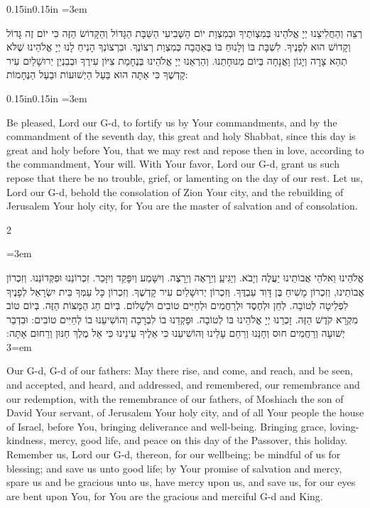 \documentclass[11pt, openany]{book}
\newenvironment{hebrewblock}{%
  \par\vspace{4pt}
  \begin{adjustwidth}{0.15in}{0.15in}
  \begingroup
  \RTL
  \hebrewfont\large
  \setstretch{1.4}
  \emergencystretch=3em
  \tolerance=9999
  \parindent=0pt\relax
}{%
  \endRTL
  \endgroup
  \end{adjustwidth}
  \par\vspace{2pt}
}
\newenvironment{englishblock}{%
  \par\vspace{2pt}
  \begin{adjustwidth}{0.15in}{0.15in}
  \setstretch{1.4}
  \emergencystretch=3em
  \tolerance=9999
  \normalsize
}{%
  \end{adjustwidth}
  \par\vspace{3pt}
}
\newenvironment{bilingual}{%
  \par\vspace{4pt}%
  \begin{paracol}{2}%
}{%
  \end{paracol}%
  \par\vspace{2pt}%
}
\newenvironment{hebrewcol}{%
  \switchcolumn[1]%
  \begingroup
  \RTL
  \hebrewfont\large
  \setstretch{1.4}%
  \emergencystretch=3em
  \tolerance=9999
  \parindent=0pt\relax
}{%
  \endRTL
  \endgroup
}
\newenvironment{englishcol}{%
  \switchcolumn[0]%
  \begingroup
  \setstretch{1.4}%
  \emergencystretch=3em
  \tolerance=9999
  \normalsize
  \rightskip=0.12in\relax
}{%
  \endgroup
}
\newenvironment{shabbatadd}{%
  \par\vspace{3pt}
  \begin{tcolorbox}[
    enhanced,
    breakable,
    colback=sederblue!6,
    colframe=sederblue!6,
    boxrule=0pt,
    left=18pt,
    right=18pt,
    top=6pt,
    bottom=6pt,
    borderline north={0.5pt}{0pt}{sederblue!25},
    borderline south={0.5pt}{0pt}{sederblue!25},
    arc=0pt,
    outer arc=0pt,
    before upper={\small\textcolor{sederblue}{\textit{On Shabbat add:}}\par\vspace{2pt}},
  ]
}{%
  \end{tcolorbox}
  \par\vspace{3pt}
}
\begin{document}
\begin{shabbatadd}

\begin{hebrewblock}
רְצֵה וְהַחֲלִיצֵנוּ יְיָ אֱלֹהֵינוּ בְּמִצְוֹתֶיךָ וּבְמִצְוַת יוֹם הַשְּׁבִיעִי הַשַּׁבָּת הַגָּדוֹל וְהַקָּדוֹשׂ הַזֶּה כִּי יוֹם זֶה גָּדוֹל וְקָדוֹשׁ הוּא לְפָנֶיךָ. לִשְׁבָּת בּוֹ וְלָנוּחַ בּוֹ בְּאַהֲבָה כְּמִצְוַת רְצוֹנֶךָ. וּבִרְצוֹנְךָ הָנִיחַ לָנוּ יְיָ אֱלֹהֵינוּ שֶׁלֹּא תְהֵא צָרָה וְיָגוֹן וַאֲנָחָה בְּיוֹם מְנוּחָתֵנוּ. וְהַרְאֵנוּ יְיָ אֱלֹהֵינוּ בְּנֶחָמַת צִיּוֹן עִירֶךָ וּבְבִנְיַן יְרוּשָׁלַיִם עִיר קָדְשֶׁךָ כִּי אַתָּה הוּא בַּעַל הַיְשׁוּעוֹת וּבַעַל הַנֶּחָמוֹת:
\end{hebrewblock}
\begin{englishblock}
Be pleased, Lord our G-d, to fortify us by Your commandments, and by the commandment of the seventh day, this great and holy Shabbat, since this day is great and holy before You, that we may rest and repose then in love, according to the commandment, Your will. With Your favor, Lord our G-d, grant us such repose that there be no trouble, grief, or lamenting on the day of our rest. Let us, Lord our G-d, behold the consolation of Zion Your city, and the rebuilding of Jerusalem Your holy city, for You are the master of salvation and of consolation.
\end{englishblock}
\end{shabbatadd}
\begin{bilingual}
\begin{hebrewcol}
אֱלֹהֵינוּ וֵאלֹהֵי אֲבוֹתֵינוּ יַעֲלֶה וְיָבֹא. וְיַגִּיעַַ וְיֵרָאֶה וְיֵרָצֶה. וְיִשָּׁמַע וְיִפָּקֵד וְיִזָּכֵר. זִכְרוֹנֵנוּ וּפִקְּדוֹנֵנוּ. וְזִכְרוֹן אֲבוֹתֵינוּ, וְזִכְרוֹן מָשִׁיחַ בֶּן דָּוִד עַבְדֶּךָ. וְזִכְרוֹן יְרוּשָׁלַיִם עִיר קָדְשֶׁךָ. וְזִכְרוֹן כָּל עַמְּךָ בֵּית יִשְׂרָאֵל לְפָנֶיךָ לִפְלֵיטָה לְטוֹבָה. לְחֵן וּלְחֶסֶד וּלְרַחֲמִים וּלְחַיִּים טוֹבִים וּלְשָׁלוֹם. בְּיוֹם חַג הַמַּצּוֹת הַזֶּה. בְּיוֹם טוֹב מִקְרָא קֹדֶשׁ הַזֶּה. זָכְרֵנוּ יְיָ אֱלֹהֵינוּ בּוֹ לְטוֹבָה. וּפָקְדֵנוּ בוֹ לִבְרָכָה וְהוֹשִׁיעֵנוּ בוֹ לְחַיִּים טוֹבִים: וּבִדְבַר יְשׁוּעָה וְרַחֲמִים חוּס וְחָנֵּנוּ וְרַחֵם עָלֵינוּ וְהוֹשִׁיעֵנוּ כִּי אֵלֶיךָ עֵינֵינוּ כִּי אֵל מֶלֶךְ חַנּוּן וְרַחוּם אָתָּה:
\end{hebrewcol}
\begin{englishcol}
Our G-d, G-d of our fathers: May there rise, and come, and reach, and be seen, and accepted, and heard, and addressed, and remembered, our remembrance and our redemption, with the remembrance of our fathers, of Moshiach the son of David Your servant, of Jerusalem Your holy city, and of all Your people the house of Israel, before You, bringing deliverance and well-being. Bringing grace, loving-kindness, mercy, good life, and peace on this day of the Passover, this holiday. Remember us, Lord our G-d, thereon, for our wellbeing; be mindful of us for blessing; and save us unto good life; by Your promise of salvation and mercy, spare us and be gracious unto us, have mercy upon us, and save us, for our eyes are bent upon You, for You are the gracious and merciful G-d and King.
\end{englishcol}
\end{bilingual}
\end{document}
